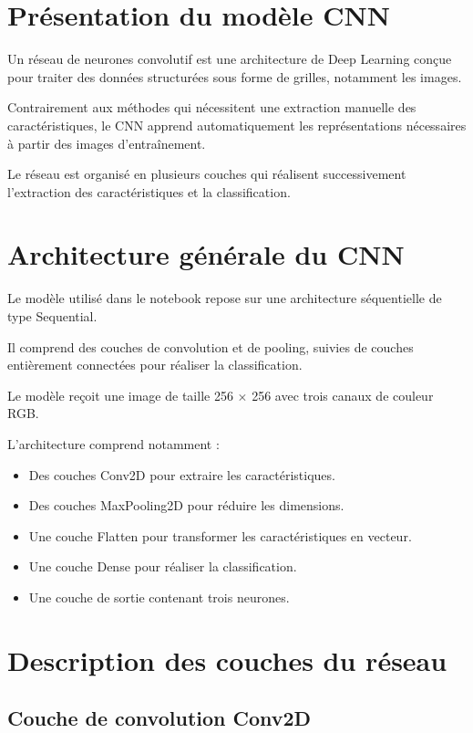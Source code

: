 \documentclass[12pt,a4paper,oneside]{report}
\begin{document}
\section{Présentation du modèle CNN}

Un réseau de neurones convolutif est une architecture
de Deep Learning conçue pour traiter des données
structurées sous forme de grilles, notamment les images.

Contrairement aux méthodes qui nécessitent une extraction
manuelle des caractéristiques, le CNN apprend automatiquement
les représentations nécessaires à partir des images
d'entraînement.

Le réseau est organisé en plusieurs couches qui réalisent
successivement l'extraction des caractéristiques et
la classification.

\section{Architecture générale du CNN}

Le modèle utilisé dans le notebook repose sur une
architecture séquentielle de type Sequential.

Il comprend des couches de convolution et de pooling,
suivies de couches entièrement connectées pour réaliser
la classification.

Le modèle reçoit une image de taille 256 $\times$ 256
avec trois canaux de couleur RGB.

L'architecture comprend notamment :

\begin{itemize}
    \item Des couches Conv2D pour extraire les caractéristiques.
    \item Des couches MaxPooling2D pour réduire les dimensions.
    \item Une couche Flatten pour transformer les
    caractéristiques en vecteur.
    \item Une couche Dense pour réaliser la classification.
    \item Une couche de sortie contenant trois neurones.
\end{itemize}

\section{Description des couches du réseau}

\subsection{Couche de convolution Conv2D}
\end{document}
